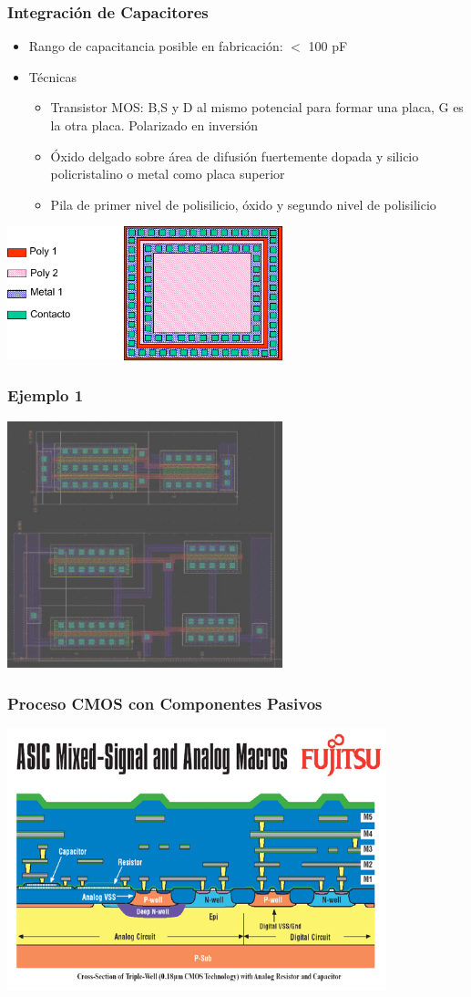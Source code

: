 \documentclass[aspectratio=169,10pt]{beamer}
\begin{document}
\begin{frame}[t]
\frametitle{Integración de Capacitores}
\begin{itemize}
	\item Rango de capacitancia posible en fabricación: $<$ 100 pF
	\item Técnicas
	\begin{itemize}
		\item Transistor MOS: B,S y D al mismo potencial para formar una placa, G es la otra placa. Polarizado en inversión
		\item Óxido delgado sobre área de difusión fuertemente dopada y silicio policristalino o metal como placa superior
		\item Pila de primer nivel de polisilicio, óxido y segundo nivel de polisilicio
	\end{itemize}
\end{itemize}

\centering\vspace{5mm}
\includegraphics[width=8cm]{caps}
\end{frame}


\begin{frame}[t]
\frametitle{Ejemplo 1}
\centering
\includegraphics[width=8cm]{ejemplo}
\end{frame}


\begin{frame}[t]
\frametitle{Proceso CMOS con Componentes Pasivos}
\centering
\includegraphics[width=11cm]{fujitsu}
\end{frame}
\end{document}
